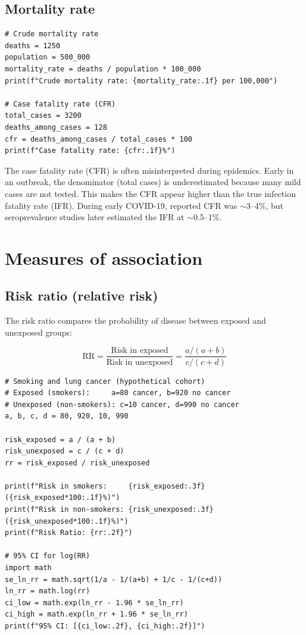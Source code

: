\subsection{Mortality rate}

\begin{verbatim}
# Crude mortality rate
deaths = 1250
population = 500_000
mortality_rate = deaths / population * 100_000
print(f"Crude mortality rate: {mortality_rate:.1f} per 100,000")

# Case fatality rate (CFR)
total_cases = 3200
deaths_among_cases = 128
cfr = deaths_among_cases / total_cases * 100
print(f"Case fatality rate: {cfr:.1f}%")
\end{verbatim}

\begin{clinicalnote}
The case fatality rate (CFR) is often misinterpreted during epidemics. Early in an outbreak, the denominator (total cases) is underestimated because many mild cases are not tested. This makes the CFR appear higher than the true infection fatality rate (IFR). During early COVID-19, reported CFR was $\sim$3--4\%, but seroprevalence studies later estimated the IFR at $\sim$0.5--1\%.
\end{clinicalnote}

\section{Measures of association}

\subsection{Risk ratio (relative risk)}

The risk ratio compares the probability of disease between exposed and unexposed groups:

\[
\text{RR} = \frac{\text{Risk in exposed}}{\text{Risk in unexposed}} = \frac{a/(a+b)}{c/(c+d)}
\]

\begin{verbatim}
# Smoking and lung cancer (hypothetical cohort)
# Exposed (smokers):     a=80 cancer, b=920 no cancer
# Unexposed (non-smokers): c=10 cancer, d=990 no cancer
a, b, c, d = 80, 920, 10, 990

risk_exposed = a / (a + b)
risk_unexposed = c / (c + d)
rr = risk_exposed / risk_unexposed

print(f"Risk in smokers:     {risk_exposed:.3f} ({risk_exposed*100:.1f}%)")
print(f"Risk in non-smokers: {risk_unexposed:.3f} ({risk_unexposed*100:.1f}%)")
print(f"Risk Ratio: {rr:.2f}")

# 95% CI for log(RR)
import math
se_ln_rr = math.sqrt(1/a - 1/(a+b) + 1/c - 1/(c+d))
ln_rr = math.log(rr)
ci_low = math.exp(ln_rr - 1.96 * se_ln_rr)
ci_high = math.exp(ln_rr + 1.96 * se_ln_rr)
print(f"95% CI: [{ci_low:.2f}, {ci_high:.2f}]")
\end{verbatim}

